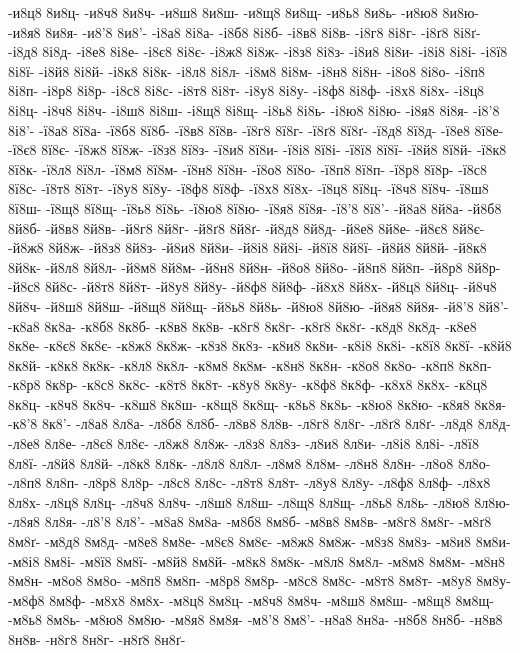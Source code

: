 {-и8ц8
8и8ц-
-и8ч8
8и8ч-
-и8ш8
8и8ш-
-и8щ8
8и8щ-
-и8ь8
8и8ь-
-и8ю8
8и8ю-
-и8я8
8и8я-
-и8'8
8и8'-
-і8а8
8і8а-
-і8б8
8і8б-
-і8в8
8і8в-
-і8г8
8і8г-
-і8ґ8
8і8ґ-
-і8д8
8і8д-
-і8е8
8і8е-
-і8є8
8і8є-
-і8ж8
8і8ж-
-і8з8
8і8з-
-і8и8
8і8и-
-і8і8
8і8і-
-і8ї8
8і8ї-
-і8й8
8і8й-
-і8к8
8і8к-
-і8л8
8і8л-
-і8м8
8і8м-
-і8н8
8і8н-
-і8о8
8і8о-
-і8п8
8і8п-
-і8р8
8і8р-
-і8с8
8і8с-
-і8т8
8і8т-
-і8у8
8і8у-
-і8ф8
8і8ф-
-і8х8
8і8х-
-і8ц8
8і8ц-
-і8ч8
8і8ч-
-і8ш8
8і8ш-
-і8щ8
8і8щ-
-і8ь8
8і8ь-
-і8ю8
8і8ю-
-і8я8
8і8я-
-і8'8
8і8'-
-ї8а8
8ї8а-
-ї8б8
8ї8б-
-ї8в8
8ї8в-
-ї8г8
8ї8г-
-ї8ґ8
8ї8ґ-
-ї8д8
8ї8д-
-ї8е8
8ї8е-
-ї8є8
8ї8є-
-ї8ж8
8ї8ж-
-ї8з8
8ї8з-
-ї8и8
8ї8и-
-ї8і8
8ї8і-
-ї8ї8
8ї8ї-
-ї8й8
8ї8й-
-ї8к8
8ї8к-
-ї8л8
8ї8л-
-ї8м8
8ї8м-
-ї8н8
8ї8н-
-ї8о8
8ї8о-
-ї8п8
8ї8п-
-ї8р8
8ї8р-
-ї8с8
8ї8с-
-ї8т8
8ї8т-
-ї8у8
8ї8у-
-ї8ф8
8ї8ф-
-ї8х8
8ї8х-
-ї8ц8
8ї8ц-
-ї8ч8
8ї8ч-
-ї8ш8
8ї8ш-
-ї8щ8
8ї8щ-
-ї8ь8
8ї8ь-
-ї8ю8
8ї8ю-
-ї8я8
8ї8я-
-ї8'8
8ї8'-
-й8а8
8й8а-
-й8б8
8й8б-
-й8в8
8й8в-
-й8г8
8й8г-
-й8ґ8
8й8ґ-
-й8д8
8й8д-
-й8е8
8й8е-
-й8є8
8й8є-
-й8ж8
8й8ж-
-й8з8
8й8з-
-й8и8
8й8и-
-й8і8
8й8і-
-й8ї8
8й8ї-
-й8й8
8й8й-
-й8к8
8й8к-
-й8л8
8й8л-
-й8м8
8й8м-
-й8н8
8й8н-
-й8о8
8й8о-
-й8п8
8й8п-
-й8р8
8й8р-
-й8с8
8й8с-
-й8т8
8й8т-
-й8у8
8й8у-
-й8ф8
8й8ф-
-й8х8
8й8х-
-й8ц8
8й8ц-
-й8ч8
8й8ч-
-й8ш8
8й8ш-
-й8щ8
8й8щ-
-й8ь8
8й8ь-
-й8ю8
8й8ю-
-й8я8
8й8я-
-й8'8
8й8'-
-к8а8
8к8а-
-к8б8
8к8б-
-к8в8
8к8в-
-к8г8
8к8г-
-к8ґ8
8к8ґ-
-к8д8
8к8д-
-к8е8
8к8е-
-к8є8
8к8є-
-к8ж8
8к8ж-
-к8з8
8к8з-
-к8и8
8к8и-
-к8і8
8к8і-
-к8ї8
8к8ї-
-к8й8
8к8й-
-к8к8
8к8к-
-к8л8
8к8л-
-к8м8
8к8м-
-к8н8
8к8н-
-к8о8
8к8о-
-к8п8
8к8п-
-к8р8
8к8р-
-к8с8
8к8с-
-к8т8
8к8т-
-к8у8
8к8у-
-к8ф8
8к8ф-
-к8х8
8к8х-
-к8ц8
8к8ц-
-к8ч8
8к8ч-
-к8ш8
8к8ш-
-к8щ8
8к8щ-
-к8ь8
8к8ь-
-к8ю8
8к8ю-
-к8я8
8к8я-
-к8'8
8к8'-
-л8а8
8л8а-
-л8б8
8л8б-
-л8в8
8л8в-
-л8г8
8л8г-
-л8ґ8
8л8ґ-
-л8д8
8л8д-
-л8е8
8л8е-
-л8є8
8л8є-
-л8ж8
8л8ж-
-л8з8
8л8з-
-л8и8
8л8и-
-л8і8
8л8і-
-л8ї8
8л8ї-
-л8й8
8л8й-
-л8к8
8л8к-
-л8л8
8л8л-
-л8м8
8л8м-
-л8н8
8л8н-
-л8о8
8л8о-
-л8п8
8л8п-
-л8р8
8л8р-
-л8с8
8л8с-
-л8т8
8л8т-
-л8у8
8л8у-
-л8ф8
8л8ф-
-л8х8
8л8х-
-л8ц8
8л8ц-
-л8ч8
8л8ч-
-л8ш8
8л8ш-
-л8щ8
8л8щ-
-л8ь8
8л8ь-
-л8ю8
8л8ю-
-л8я8
8л8я-
-л8'8
8л8'-
-м8а8
8м8а-
-м8б8
8м8б-
-м8в8
8м8в-
-м8г8
8м8г-
-м8ґ8
8м8ґ-
-м8д8
8м8д-
-м8е8
8м8е-
-м8є8
8м8є-
-м8ж8
8м8ж-
-м8з8
8м8з-
-м8и8
8м8и-
-м8і8
8м8і-
-м8ї8
8м8ї-
-м8й8
8м8й-
-м8к8
8м8к-
-м8л8
8м8л-
-м8м8
8м8м-
-м8н8
8м8н-
-м8о8
8м8о-
-м8п8
8м8п-
-м8р8
8м8р-
-м8с8
8м8с-
-м8т8
8м8т-
-м8у8
8м8у-
-м8ф8
8м8ф-
-м8х8
8м8х-
-м8ц8
8м8ц-
-м8ч8
8м8ч-
-м8ш8
8м8ш-
-м8щ8
8м8щ-
-м8ь8
8м8ь-
-м8ю8
8м8ю-
-м8я8
8м8я-
-м8'8
8м8'-
-н8а8
8н8а-
-н8б8
8н8б-
-н8в8
8н8в-
-н8г8
8н8г-
-н8ґ8
8н8ґ-
}
